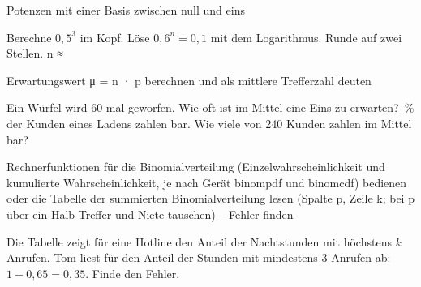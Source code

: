 \begin{aufgabe}{Potenzen mit einer Basis zwischen null und eins}
\begin{teile}
\teil Berechne $0{,}5^3$ im Kopf. \leerfeld
\teil Löse $0{,}6^n = 0{,}1$ mit dem Logarithmus. Runde auf zwei Stellen. n ≈ \leerfeld
\end{teile}
\end{aufgabe}

\begin{aufgabe}{Erwartungswert μ = n · p berechnen und als mittlere Trefferzahl deuten}
\begin{teile}
\teil Ein Würfel wird 60-mal geworfen. Wie oft ist im Mittel eine Eins zu erwarten? \leerfeld
{}\,\% der Kunden eines Ladens zahlen bar. Wie viele von 240 Kunden zahlen im Mittel bar? \leerfeld
\end{teile}
\end{aufgabe}

\begin{aufgabe}{Rechnerfunktionen für die Binomialverteilung (Einzelwahrscheinlichkeit und kumulierte Wahrscheinlichkeit, je nach Gerät binompdf und binomcdf) bedienen oder die Tabelle der summierten Binomialverteilung lesen (Spalte p, Zeile k; bei p über ein Halb Treffer und Niete tauschen) – Fehler finden}
\begin{teile}
\teil Die Tabelle zeigt für eine Hotline den Anteil der Nachtstunden mit höchstens $k$ Anrufen. Tom liest für den Anteil der Stunden mit mindestens 3 Anrufen ab: $1 - 0{,}65 = 0{,}35$. Finde den Fehler.

\end{teile}
\end{aufgabe}

